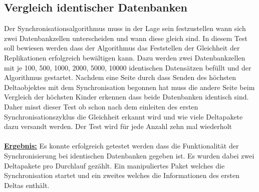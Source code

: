 \documentclass[a4paper,11pt,oneside,%
headsepline,												%
footsepline,												%
bibtotocnumbered									%
]{scrreprt}
\begin{document}
\subsection{Vergleich identischer Datenbanken}
Der Synchronisationsalgorithmus muss in der Lage sein festzustellen wann sich zwei Datenbankzellen unterscheiden und wann diese gleich sind. In diesem Test soll bewiesen werden dass der Algorithmus das Feststellen der Gleichheit der Replikationen erfolgreich bewältigen kann. Dazu werden zwei Datenbankzellen mit je 100, 500, 1000, 2000, 5000, 10000 identischen Datensätzen befüllt und der Algorithmus gestartet. Nachdem eine Seite durch dass Senden des höchsten Deltaobjektes mit dem Synchronisation begonnen hat muss die andere Seite beim Vergleich der höchsten Kinder erkennen dass beide Datenbanken identisch sind. Daher misst dieser Test ob schon nach dem einleiten des ersten Synchronisationszyklus die Gleichheit erkannt wird und wie viele Deltapakete dazu versandt werden. Der Test wird für jede Anzahl zehn mal wiederholt\\\\
\underline{{\bf Ergebnis:}} Es konnte erfolgreich getestet werden dass die Funktionalität der Synchronisierung bei identischen Datenbanken gegeben ist. Es wurden dabei zwei Deltapakete pro Durchlauf gezählt. Ein manipuliertes Paket welches die Synchronisation startet und ein zweites welches die Informationen des ersten Deltas enthält.
\end{document}
